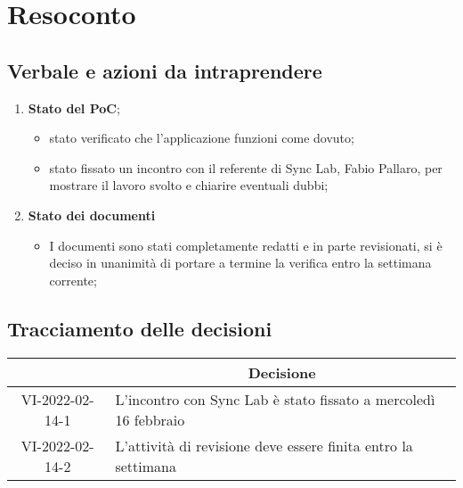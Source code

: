 \section{Resoconto}
\subsection{Verbale e azioni da intraprendere}

\begin{enumerate}
	\item \textbf{Stato del PoC};
	\begin{itemize}
		\item  stato verificato che l'applicazione funzioni come dovuto;
		\item  stato fissato un incontro con il referente di Sync Lab, Fabio Pallaro, per mostrare il lavoro svolto e chiarire eventuali dubbi;
	\end{itemize}
	\item \textbf{Stato dei documenti}
	\begin{itemize}
		\item I documenti sono stati completamente redatti e in parte revisionati, si è deciso in unanimità di portare a termine la verifica entro la settimana corrente;
	\end{itemize}
\end{enumerate}

\pagebreak

\subsection{Tracciamento delle decisioni}

\begin{table}[H]
	\centering
	\renewcommand{\arraystretch}{1.8}
	\begin{tabular}{c | p{10cm}}
		\rowcolor[HTML]{125E28}
		\multicolumn{1}{c}{\color[HTML]{FFFFFF} \textbf{ID}} &
		\multicolumn{1}{c}{\color[HTML]{FFFFFF} \textbf{Decisione}} \\
		\hline
		VI-2022-02-14-1 & L'incontro con Sync Lab è stato fissato a mercoledì 16 febbraio \\ \hline
		VI-2022-02-14-2 & L'attività di revisione deve essere finita entro la settimana \\
	\end{tabular}
\end{table}